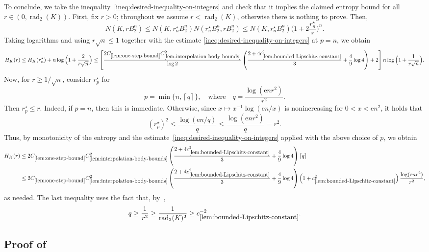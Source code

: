 \documentclass[11pt]{amsart}
\newcommand{\rad}{\operatorname{rad}_2}
\newcommand{\1}{\mathbf 1}
\newcommand{\e}{\mathrm{e}}
\newcommand{\ceil}[1]{\left\lceil #1 \right\rceil}
\theoremstyle{plain}
\begin{document}
To conclude, we take the inequality~\eqref{ineq:desired-inequality-on-integers} and check that it implies the claimed entropy bound for all $r \in (0, \rad(K))$. First, fix $r > 0$; throughout we assume $r < \rad(K)$, otherwise there is nothing to prove. Then,
\[
N(K, rB^n_2) \leq N(K, r^\star_n B^n_2)N(r^\star_nB^n_2, rB^n_2) \leq
N(K, r^\star_n B^n_2) \Big(1 + 2\frac{r^\star_n}{r}\Big)^n.
\]
Taking logarithms and using $r \sqrt{n} \leq 1$ together with the estimate \eqref{ineq:desired-inequality-on-integers} at $p = n$, we obtain
\[
H_K(r) \leq H_K(r^\star_n) + n \log \Big(1 + \frac{2}{r \sqrt{n}}\Big)
\leq
\left[
\frac{
2 C_{\ref{lem:one-step-bound}}
C_{\ref{lem:interpolation-body-bounds}}^2
}{
\log 2
}
\left(
\frac{2+4c_{\ref{lem:bounded-Lipschitz-constant}}^2}{3}
+\frac{4}{9}\log 4
\right)
+2
\right]
n\log\Big(1 + \frac{1}{r \sqrt{n}}\Big).
\]
Now, for $r \geq 1/\sqrt{n}$, consider $r^\star_p$ for
\[
p = \min\{n, \ceil{q}\}, 
\quad \mbox{where} \quad 
q = \frac{\log(\e n r^2)}{r^2}.
\]
Then $r^\star_p \leq r$. Indeed, if $p = n$, then this is immediate. Otherwise, since $x \mapsto x^{-1}\log(\e n/x)$ is nonincreasing for $0 < x < \e n^2$, it holds that 
\[
(r^\star_p)^2 \leq \frac{\log(\e n/q)}{q} \leq \frac{\log(\e n r^2)}{q}  = r^2.
\]
Thus, by monotonicity of the entropy and the estimate~\eqref{ineq:desired-inequality-on-integers} applied with the above choice of $p$, we obtain
\begin{align*}
H_K(r)
&\leq
2 C_{\ref{lem:one-step-bound}}
C_{\ref{lem:interpolation-body-bounds}}^2
\left(
\frac{2+4c_{\ref{lem:bounded-Lipschitz-constant}}^2}{3}
+\frac{4}{9}\log 4
\right)
\ceil{q}
\\
&\leq
2 C_{\ref{lem:one-step-bound}}
C_{\ref{lem:interpolation-body-bounds}}^2
\left(
\frac{2+4c_{\ref{lem:bounded-Lipschitz-constant}}^2}{3}
+\frac{4}{9}\log 4
\right)
\left(1+c_{\ref{lem:bounded-Lipschitz-constant}}^2\right)
\frac{\log(\e n r^2)}{r^2},
\end{align*}
as needed. The last inequality uses the fact that, by~,
\[
q \geq \frac{1}{r^2} \geq \frac{1}{\rad(K)^2}
\geq c_{\ref{lem:bounded-Lipschitz-constant}}^{-2}.
\]


\subsection{Proof of~\texorpdfstring{}{the covering-number theorem}}
\end{document}
